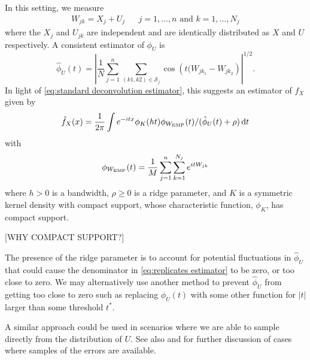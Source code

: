 	In this setting, we measure
	\begin{align}
		W_{jk} = X_j + U_j && j = 1, \dots, n \text{ and } k = 1, \dots, N_j
	\end{align}
	where the $X_j$ and $U_{jk}$ are independent and are identically distributed as $X$ and $U$ respectively. A consistent estimator of $\phi_U$ is
	\begin{equation}
		\hat{\phi}_U(t) = \left|\frac{1}{N} \sum_{j = 1}^n \sum_{(k1, k2) \in \mathscr{S}_j} \cos \left(t (W_{jk_1} - W_{jk_2}\right)\right|^{1/2}.
	\end{equation}
	In light of \eqref{eq:standard deconvolution estimator}, this suggests an estimator of $f_X$ given by 
	\begin{equation}
	\label{eq:replicates estimator}
		\hat{f}_X(x) = \frac{1}{2\pi} \int e^{-itx} \phi_K(ht) \phi_{W_\mathrm{EMP}}(t)  / (\hat{\phi}_U(t) + \rho )\, \mathrm{d} t
	\end{equation}
	with
	\begin{equation}
		\phi_{W_\mathrm{EMP}}(t) = \frac{1}{M} \sum_{j = 1}^n \sum_{k= 1}^{N_j} e^{i t W_{jk}}
	\end{equation}
	where
	$h > 0$ is a bandwidth, $\rho \geq 0$ is a ridge parameter, and $K$ is a symmetric kernel density with compact support, whose characteristic function, $\phi_K$, has compact support.

	[WHY COMPACT SUPPORT?]

	The presence of the ridge parameter is to account for potential fluctuations in $\hat{\phi}_U$ that could cause the denominator in \eqref{eq:replicates estimator} to be zero, or too close to zero. We may alternatively use another method to prevent $\hat{\phi}_U$ from getting too close to zero such as replacing $\hat{\phi}_U(t)$ with some other function for $|t|$ larger than some threshold $t^*$.

	A similar approach could be used in scenarios where we are able to sample directly from the distribution of $U$. See also \cite{Diggle1993-jy} and \cite{Neumann1997-cr} for further discussion of cases where samples of the errors are available.

